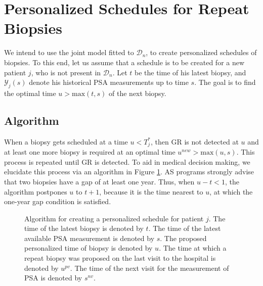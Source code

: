 \section{Personalized Schedules for Repeat Biopsies}
\label{sec : pers_sched_approaches}
We intend to use the joint model fitted to $\mathcal{D}_n$, to create personalized schedules of biopsies. To this end, let us assume that a schedule is to be created for a new patient $j$, who is not present in $\mathcal{D}_n$. Let $t$ be the time of his latest biopsy, and $\mathcal{Y}_j(s)$ denote his historical PSA measurements up to time $s$. The goal is to find the optimal time $u > \mbox{max}(t,s)$ of the next biopsy.





\subsection{Algorithm}
\label{subsec : pers_sched_algorithm}
When a biopsy gets scheduled at a time $u < T^*_j$, then GR is not detected at $u$ and at least one more biopsy is required at an optimal time $u^{new} > \mbox{max}(u,s)$. This process is repeated until GR is detected. To aid in medical decision making, we elucidate this process via an algorithm in Figure \ref{fig : sched_algorithm}. AS programs strongly advise that two biopsies have a gap of at least one year. Thus, when $u - t < 1$, the algorithm postpones $u$ to $t + 1$, because it is the time nearest to $u$, at which the one-year gap condition is satisfied.


\begin{figure}
\centerline{}
\caption{Algorithm for creating a personalized schedule for patient $j$. The time of the latest biopsy is denoted by $t$. The time of the latest available PSA measurement is denoted by $s$. The proposed personalized time of biopsy is denoted by $u$.  The time at which a repeat biopsy was proposed on the last visit to the hospital is denoted by $u^{pv}$. The time of the next visit for the measurement of PSA is denoted by $s^{nv}$.} 
\label{fig : sched_algorithm}
\end{figure}

